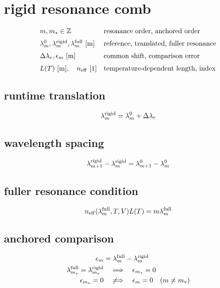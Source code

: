 \section*{rigid resonance comb}
\[
\begin{array}{ll}m,m_*\in\mathbb Z&\text{resonance order, anchored order}\\[0.6em]\lambda_m^0,\lambda_m^{\rm rigid},\lambda_m^{\rm full}\ [\mathrm m]&\text{reference, translated, fuller resonance}\\[0.6em]\Delta\lambda_r,\epsilon_m\ [\mathrm m]&\text{common shift, comparison error}\\[0.6em]L(T)\ [\mathrm m],\quad n_{\rm eff}\ [1]&\text{temperature-dependent length, index}\end{array}
\]
\subsection*{runtime translation}
\[
\displaystyle \lambda_m^{\rm rigid}=\lambda_m^0+\Delta\lambda_r
\]
\subsection*{wavelength spacing}
\[
\displaystyle \lambda_{m+1}^{\rm rigid}-\lambda_m^{\rm rigid}=\lambda_{m+1}^0-\lambda_m^0
\]
\subsection*{fuller resonance condition}
\[
\displaystyle n_{\rm eff}(\lambda_m^{\rm full},T,V)L(T)=m\lambda_m^{\rm full}
\]
\subsection*{anchored comparison}
\[
\displaystyle \begin{aligned}\epsilon_m&=\lambda_m^{\rm full}-\lambda_m^{\rm rigid}\\\lambda_{m_*}^{\rm full}=\lambda_{m_*}^{\rm rigid}&\quad\Longrightarrow\quad\epsilon_{m_*}=0\\\epsilon_{m_*}=0&\quad\not\Longrightarrow\quad\epsilon_m=0\quad(m\ne m_*)\end{aligned}
\]
